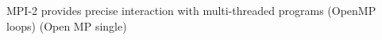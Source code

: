 MPI-2 provides precise interaction with multi-threaded programs
  (OpenMP loops)
 (Open MP single)

